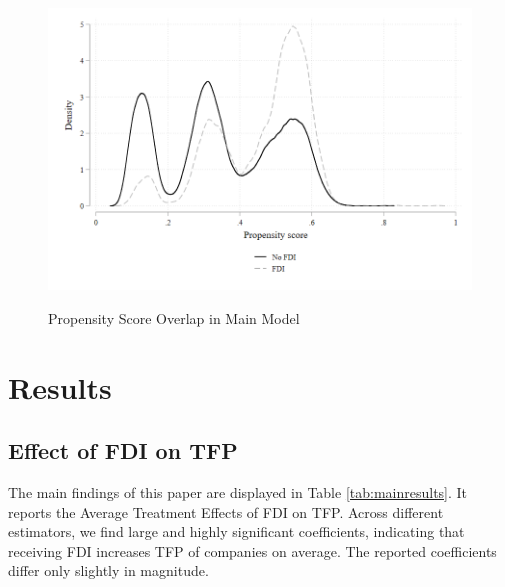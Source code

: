 \documentclass[a4paper,11pt]{scrartcl}
\begin{document}
\begin{figure}[h!]
	\centering
	\caption{Propensity Score Overlap in Main Model}
	\includegraphics[width=\textwidth]{graph}
  	\label{fig:graph}
\end{figure} 

\section{Results}

\subsection{Effect of FDI on TFP}
The main findings of this paper are displayed in Table \ref{tab:mainresults}. It reports the Average Treatment Effects of FDI on TFP. Across different estimators, we find large and highly significant coefficients, indicating that receiving FDI increases TFP of companies on average. The reported coefficients differ only slightly in magnitude. 
\end{document}
